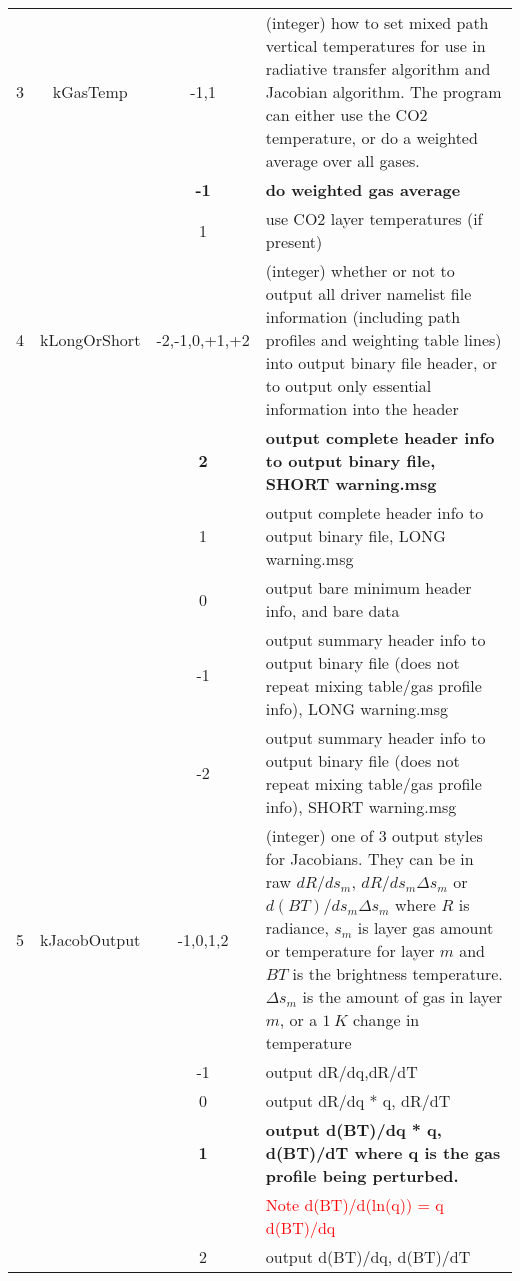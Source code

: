 \documentclass[12pt]{article}
\newlength{\colwidth}
\newlength{\colwidthshort}
\begin{document}
\begin{small}
\begin{longtable}{|c|c|c|p{\colwidthshort}|}
3  & {\sf kGasTemp} & -1,1       & (integer) how to set mixed path vertical 
temperatures for use in radiative transfer algorithm and Jacobian algorithm. 
The program can either use the CO2 temperature, or do a weighted average 
over all gases.\\
   &        & {\bf -1}    & {\bf do weighted gas average}\\
   &        & 1           &  use CO2 layer temperatures (if present)\\\hline

4  & {\sf kLongOrShort} &-2,-1,0,+1,+2    & (integer) whether or not to output all 
driver namelist file information (including path profiles and weighting table 
lines) into output binary file header, or to output only essential 
information into the header \\
   &  & {\bf 2}   & {\bf output complete header info to output binary file, SHORT warning.msg} \\
   &  & 1        & output complete header info to output binary file, LONG warning.msg \\
   &  & 0        & output bare minimum header info, and bare data\\
   &  & -1       & output summary header info to output binary file
                    (does not repeat mixing table/gas profile info), LONG warning.msg\\
   &  & -2       & output summary header info to output binary file
                    (does not repeat mixing table/gas profile info), SHORT warning.msg\\  \hline
5 & {\sf kJacobOutput} & -1,0,1,2 & (integer) one of 3 output styles for 
    Jacobians.  They can be in raw $dR/ds_{m}$, $dR/ds_{m} \Delta s_{m}$ or 
    $d(BT)/ds_{m} \Delta s_{m}$ where $R$ is radiance, $s_{m}$ is layer gas 
    amount or temperature for layer $m$ and $BT$ is the brightness 
    temperature.  $\Delta s_{m}$ is the amount of gas in layer $m$, or a 
    $1~K$ change in temperature \\
  &      & -1        & output dR/dq,dR/dT\\
  &      & 0         & output dR/dq * q, dR/dT\\
  &      & {\bf 1}   & {\bf output d(BT)/dq * q, d(BT)/dT
                       where q is the gas profile being perturbed.}\\ 
  &      &           & \textcolor{red}{Note d(BT)/d(ln(q)) = q d(BT)/dq} \\
  &      & 2         & output d(BT)/dq, d(BT)/dT \\

\end{longtable}
\end{small}
\end{document}
